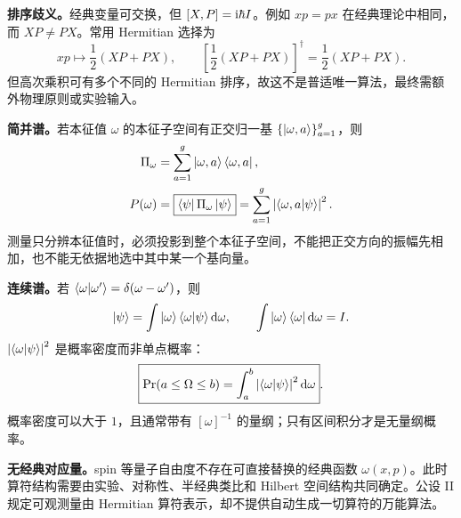 

\textbf{排序歧义。}经典变量可交换，但 $\left[X,P\right]=\mathrm{i}\hbar I$。例如 $xp=px$ 在经典理论中相同，而 $XP\neq PX$。常用 Hermitian 选择为
\begin{equation}
  xp\longmapsto\frac12(XP+PX),
  \qquad
  \left[\frac12(XP+PX)\right]^\dagger
  =\frac12(XP+PX).
  \label{eq:QM-C04-S02-symmetric-ordering}
\end{equation}
但高次乘积可有多个不同的 Hermitian 排序，故这不是普适唯一算法，最终需额外物理原则或实验输入。

\textbf{简并谱。}若本征值 $\omega$ 的本征子空间有正交归一基 $\{\left|\omega,a\right\rangle\}_{a=1}^{g}$，则
\begin{align}
  \Pi_\omega
  &=\sum_{a=1}^{g}\left|\omega,a\right\rangle\left\langle \omega,a\right|,
  \label{eq:QM-C04-S02-degenerate-projector}\\
  P(\omega)
  &=\boxed{\left\langle \psi\right|\Pi_\omega\left|\psi\right\rangle}
   =\sum_{a=1}^{g}\left|\left\langle \omega,a \middle| \psi \right\rangle\right|^2.
  \label{eq:QM-C04-S02-degenerate-probability}
\end{align}
测量只分辨本征值时，必须投影到整个本征子空间，不能把正交方向的振幅先相加，也不能无依据地选中其中某一个基向量。

\textbf{连续谱。}若 $\left\langle \omega \middle| \omega' \right\rangle=\delta(\omega-\omega')$，则
\begin{equation}
  \left|\psi\right\rangle
  =\int\left|\omega\right\rangle\left\langle \omega \middle| \psi \right\rangle\mathop{}\!\mathrm{d}\omega,
  \qquad
  \int\left|\omega\right\rangle\left\langle \omega\right|\mathop{}\!\mathrm{d}\omega=I.
  \label{eq:QM-C04-S02-continuous-expansion}
\end{equation}
$\left|\left\langle \omega \middle| \psi \right\rangle\right|^2$ 是概率密度而非单点概率：
\begin{equation}
  \boxed{
  \Pr(a\leq\Omega\leq b)
  =\int_a^b\left|\left\langle \omega \middle| \psi \right\rangle\right|^2\mathop{}\!\mathrm{d}\omega}.
  \label{eq:QM-C04-S02-continuous-interval-probability}
\end{equation}
概率密度可以大于 $1$，且通常带有 $[\omega]^{-1}$ 的量纲；只有区间积分才是无量纲概率。

\textbf{无经典对应量。}spin 等量子自由度不存在可直接替换的经典函数 $\omega(x,p)$。此时算符结构需要由实验、对称性、半经典类比和 Hilbert 空间结构共同确定。公设 II 规定可观测量由 Hermitian 算符表示，却不提供自动生成一切算符的万能算法。



